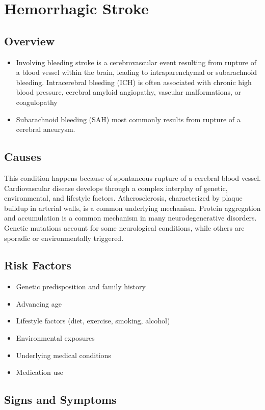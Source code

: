 \chapter{Hemorrhagic Stroke}
\label{sec:Hemorrhagic Stroke}

\section{Overview}


\begin{itemize}[noitemsep]
  \item Involving bleeding stroke is a cerebrovascular event resulting from rupture of a blood vessel within the brain, leading to intraparenchymal or subarachnoid bleeding. Intracerebral bleeding (ICH) is often associated with chronic high blood pressure, cerebral amyloid angiopathy, vascular malformations, or coagulopathy
  \item Subarachnoid bleeding (SAH) most commonly results from rupture of a cerebral aneurysm.
\end{itemize}
\section{Causes}
This condition happens because of spontaneous rupture of a cerebral blood vessel. Cardiovascular disease develops through a complex interplay of genetic, environmental, and lifestyle factors. Atherosclerosis, characterized by plaque buildup in arterial walls, is a common underlying mechanism.    Protein aggregation and accumulation is a common mechanism in many neurodegenerative disorders.  Genetic mutations account for some neurological conditions, while others are sporadic or environmentally triggered.   
\section{Risk Factors}
\begin{itemize}[noitemsep]
  \item Genetic predisposition and family history
  \item Advancing age
  \item Lifestyle factors (diet, exercise, smoking, alcohol)
  \item Environmental exposures
  \item Underlying medical conditions
  \item Medication use
\end{itemize}
\section{Signs and Symptoms}
